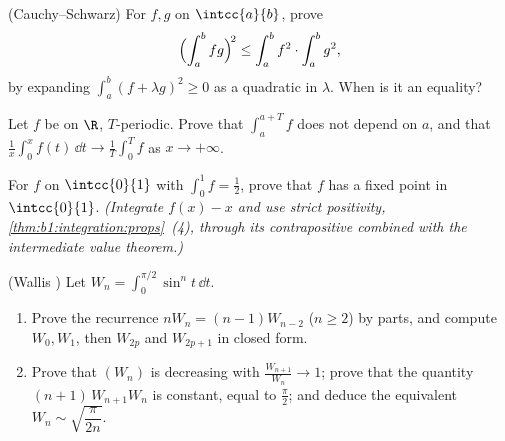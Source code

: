 \begin{exercise}[$\star\star$]\label{exo:b1:integration:5}
(Cauchy--Schwarz) For $f, g$  on $\intcc{a}{b}$, prove
\[
\Bigl(\int_a^b fg\Bigr)^{\!2} \leq \int_a^b f^2 \cdot \int_a^b g^2 ,
\]
by expanding $\int_a^b (f + \lambda g)^2 \geq 0$ as a quadratic in
$\lambda$. When is it an equality?
\end{exercise}

\begin{exercise}[$\star\star$]\label{exo:b1:integration:6}
Let $f$ be  on $\R$, $T$-periodic. Prove that $\int_a^{a+T}
f$ does not depend on $a$, and that $\frac1x \int_0^x f(t)\,\dd t
\to \frac 1T \int_0^T f$ as $x \to +\infty$.
\end{exercise}

\begin{exercise}[$\star\star$]\label{exo:b1:integration:7}
For $f$  on $\intcc{0}{1}$ with $\int_0^1 f = \frac12$,
prove that $f$ has a fixed point in $\intcc{0}{1}$. \emph{(Integrate
$f(x) - x$ and use strict positivity,
\cref{thm:b1:integration:props}~(4), through its contrapositive
combined with the intermediate value theorem.)}
\end{exercise}

\begin{exercise}[$\star\star\star$]\label{exo:b1:integration:8}
(Wallis ) Let $W_n = \int_0^{\pi/2} \sin^n t\,\dd t$.
\begin{enumerate}
  \item Prove the recurrence $n W_n = (n-1) W_{n-2}$ ($n \geq 2$) by
        parts, and compute $W_0, W_1$, then $W_{2p}$ and $W_{2p+1}$
        in closed form.
  \item Prove that $(W_n)$ is decreasing with $\frac{W_{n+1}}{W_n}
        \to 1$; prove that the quantity $(n+1)\,W_{n+1} W_n$ is
        constant, equal to $\frac\pi2$; and deduce the equivalent
        $W_n \sim \sqrt{\dfrac{\pi}{2n}}$.
\end{enumerate}
\end{exercise}

